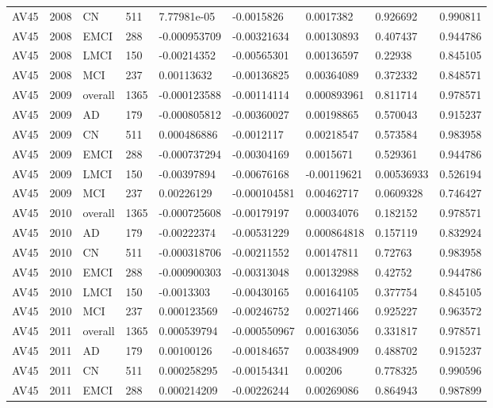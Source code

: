 \begin{landscape}
\begin{longtable}{lllllllll}
AV45 & 2008 & CN & 511 & 7.77981e-05 & -0.0015826 & 0.0017382 & 0.926692 & 0.990811 \\
AV45 & 2008 & EMCI & 288 & -0.000953709 & -0.00321634 & 0.00130893 & 0.407437 & 0.944786 \\
AV45 & 2008 & LMCI & 150 & -0.00214352 & -0.00565301 & 0.00136597 & 0.22938 & 0.845105 \\
AV45 & 2008 & MCI & 237 & 0.00113632 & -0.00136825 & 0.00364089 & 0.372332 & 0.848571 \\
AV45 & 2009 & overall & 1365 & -0.000123588 & -0.00114114 & 0.000893961 & 0.811714 & 0.978571 \\
AV45 & 2009 & AD & 179 & -0.000805812 & -0.00360027 & 0.00198865 & 0.570043 & 0.915237 \\
AV45 & 2009 & CN & 511 & 0.000486886 & -0.0012117 & 0.00218547 & 0.573584 & 0.983958 \\
AV45 & 2009 & EMCI & 288 & -0.000737294 & -0.00304169 & 0.0015671 & 0.529361 & 0.944786 \\
AV45 & 2009 & LMCI & 150 & -0.00397894 & -0.00676168 & -0.00119621 & 0.00536933 & 0.526194 \\
AV45 & 2009 & MCI & 237 & 0.00226129 & -0.000104581 & 0.00462717 & 0.0609328 & 0.746427 \\
AV45 & 2010 & overall & 1365 & -0.000725608 & -0.00179197 & 0.00034076 & 0.182152 & 0.978571 \\
AV45 & 2010 & AD & 179 & -0.00222374 & -0.00531229 & 0.000864818 & 0.157119 & 0.832924 \\
AV45 & 2010 & CN & 511 & -0.000318706 & -0.00211552 & 0.00147811 & 0.72763 & 0.983958 \\
AV45 & 2010 & EMCI & 288 & -0.000900303 & -0.00313048 & 0.00132988 & 0.42752 & 0.944786 \\
AV45 & 2010 & LMCI & 150 & -0.0013303 & -0.00430165 & 0.00164105 & 0.377754 & 0.845105 \\
AV45 & 2010 & MCI & 237 & 0.000123569 & -0.00246752 & 0.00271466 & 0.925227 & 0.963572 \\
AV45 & 2011 & overall & 1365 & 0.000539794 & -0.000550967 & 0.00163056 & 0.331817 & 0.978571 \\
AV45 & 2011 & AD & 179 & 0.00100126 & -0.00184657 & 0.00384909 & 0.488702 & 0.915237 \\
AV45 & 2011 & CN & 511 & 0.000258295 & -0.00154341 & 0.00206 & 0.778325 & 0.990596 \\
AV45 & 2011 & EMCI & 288 & 0.000214209 & -0.00226244 & 0.00269086 & 0.864943 & 0.987899 \\

\end{longtable}
\end{landscape}
